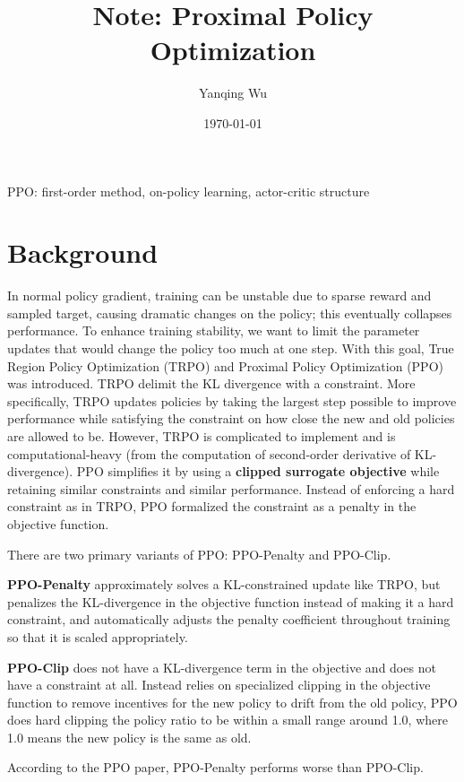 \documentclass[lang=en,mode=normal,device=normal,color=blue,12pt]{elegantnote}
\title{Note: Proximal Policy Optimization}
\author{Yanqing Wu}
\institute{Viwistar Robotics}
\date{\today}
\DeclareMathOperator*{\1}{\mathbbm{1}}
\begin{document}
\maketitle

\newpage

PPO: first-order method, on-policy learning, actor-critic structure

\section{Background}

In normal policy gradient, training can be unstable due to sparse reward and sampled target, causing dramatic changes on the policy; this eventually collapses performance.
To enhance training stability, we want to limit the parameter updates that would change the policy too much at one step.
With this goal, True Region Policy Optimization (TRPO) and Proximal Policy Optimization (PPO) was introduced.
TRPO delimit the KL divergence with a constraint. More specifically, TRPO updates policies by taking the largest step possible to improve performance while satisfying the constraint on how close the new and old policies are allowed to be.
However, TRPO is complicated to implement and is computational-heavy (from the computation of second-order derivative of KL-divergence). PPO simplifies it by using a \textbf{clipped surrogate objective} while retaining similar constraints and similar performance.
Instead of enforcing a hard constraint as in TRPO, PPO formalized the constraint as a penalty in the objective function.

There are two primary variants of PPO: PPO-Penalty and PPO-Clip.

\textbf{PPO-Penalty} approximately solves a KL-constrained update like TRPO, but penalizes the KL-divergence in the objective function instead of making it a hard constraint, and automatically adjusts the penalty coefficient throughout training so that it is scaled appropriately.

\textbf{PPO-Clip} does not have a KL-divergence term in the objective and does not have a constraint at all. Instead relies on specialized clipping in the objective function to remove incentives for the new policy to drift from the old policy, PPO does hard clipping the policy ratio to be within a small range around 1.0, where 1.0 means the new policy is the same as old.

 According to the PPO paper, PPO-Penalty performs worse than PPO-Clip.
\end{document}
